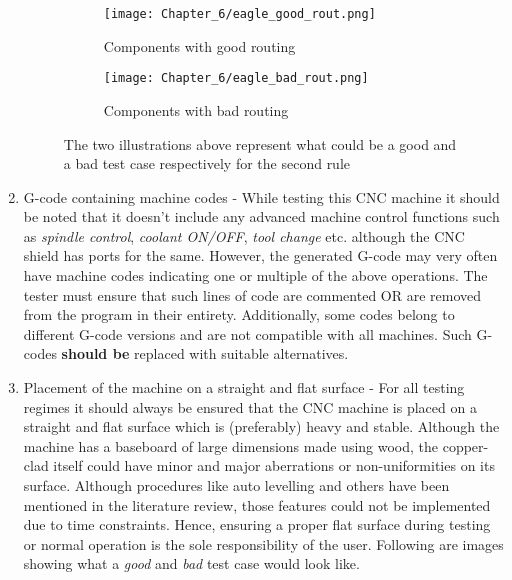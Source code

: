 \begin{enumerate}
       \begin{figure}[h]

        \begin{subfigure}{0.5\textwidth}
         \hspace{8mm}
         \texttt{[image: Chapter\_6/eagle\_good\_rout.png]}
         \caption{Components with good routing}
         \label{fig:grout}
        \end{subfigure}
        \begin{subfigure}{0.5\textwidth}
         \hspace{8mm}
         \texttt{[image: Chapter\_6/eagle\_bad\_rout.png]}
         \caption{Components with bad routing}
         \label{fig:brout}
        \end{subfigure}

        \caption{The two illustrations above represent what could be a good and a bad test case respectively for the second rule}
        \label{fig:gbrout}
       \end{figure}

 \item G-code containing machine codes - While testing this CNC machine it should be noted that it doesn’t include any advanced machine control functions such as \textit{spindle control}, \textit{coolant ON/OFF}, \textit{tool change} etc. although the CNC shield has ports for the same. However, the generated G-code may very often have machine codes indicating one or multiple of the above operations. The tester must ensure that such lines of code are commented OR are removed from the program in their entirety. Additionally, some codes belong to different G-code versions and are not compatible with all machines. Such G-codes \textbf{should be} replaced with suitable alternatives.

 \item Placement of the machine on a straight and flat surface - For all testing regimes it should always be ensured that the CNC machine is placed on a straight and flat surface which is (preferably) heavy and stable. Although the machine has a baseboard of large dimensions made using wood, the copper-clad itself could have minor and major aberrations or non-uniformities on its surface. Although procedures like auto levelling and others have been mentioned in the literature review, those features could not be implemented due to time constraints. Hence, ensuring a proper flat surface during testing or normal operation is the sole responsibility of the user. Following are images showing what a \textit{good} and \textit{bad} test case would look like.


\end{enumerate}
